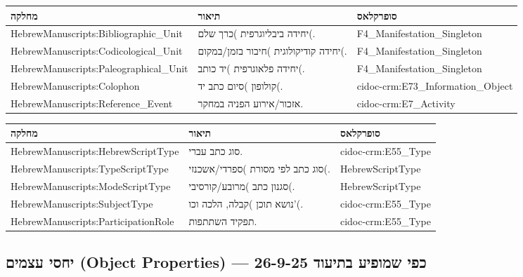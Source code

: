 {\small
\begin{longtable}{|p{4.5cm}|p{8.5cm}|p{3cm}|}
\hline
\textbf{מחלקה} & \textbf{תיאור} & \textbf{סופרקלאס} \\
\hline
\endhead

\textenglish{HebrewManuscripts:Bibliographic\_Unit} & יחידה ביבליוגרפית )כרך שלם(. & \textenglish{F4\_Manifestation\_Singleton} \\
\hline
\textenglish{HebrewManuscripts:Codicological\_Unit} & יחידה קודיקולוגית )חיבור בזמן/במקום(. & \textenglish{F4\_Manifestation\_Singleton} \\
\hline
\textenglish{HebrewManuscripts:Paleographical\_Unit} & יחידה פלאוגרפית )יד כותב(. & \textenglish{F4\_Manifestation\_Singleton} \\
\hline
\textenglish{HebrewManuscripts:Colophon} & קולופון )סיום כתב יד(. & \textenglish{cidoc-crm:E73\_Information\_Object} \\
\hline
\textenglish{HebrewManuscripts:Reference\_Event} & אזכור/אירוע הפניה במחקר. & \textenglish{cidoc-crm:E7\_Activity} \\
\hline
\end{longtable}
}

{\small
\begin{longtable}{|p{4.5cm}|p{8.5cm}|p{3cm}|}
\hline
\textbf{מחלקה} & \textbf{תיאור} & \textbf{סופרקלאס} \\
\hline
\endhead

\textenglish{HebrewManuscripts:HebrewScriptType} & סוג כתב עברי. & \textenglish{cidoc-crm:E55\_Type} \\
\hline
\textenglish{HebrewManuscripts:TypeScriptType} & סוג כתב לפי מסורת )ספרדי/אשכנזי(. & \textenglish{HebrewScriptType} \\
\hline
\textenglish{HebrewManuscripts:ModeScriptType} & סגנון כתב )מרובע/קורסיבי(. & \textenglish{HebrewScriptType} \\
\hline
\textenglish{HebrewManuscripts:SubjectType} & נושא תוכן )קבלה, הלכה וכו'(. & \textenglish{cidoc-crm:E55\_Type} \\
\hline
\textenglish{HebrewManuscripts:ParticipationRole} & תפקיד השתתפות. & \textenglish{cidoc-crm:E55\_Type} \\
\hline
\end{longtable}
}

\subsection{יחסי עצמים (Object Properties) — כפי שמופיע בתיעוד 26-9-25}

